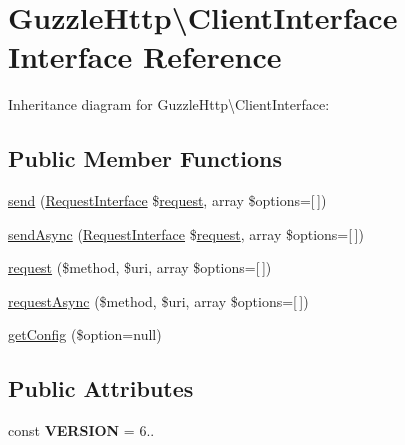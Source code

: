 \hypertarget{interfaceGuzzleHttp_1_1ClientInterface}{}\section{Guzzle\+Http\textbackslash{}Client\+Interface Interface Reference}
\label{interfaceGuzzleHttp_1_1ClientInterface}


Inheritance diagram for Guzzle\+Http\textbackslash{}Client\+Interface\+:
\subsection*{Public Member Functions}
\begin{DoxyCompactItemize}
\item 
\hyperlink{interfaceGuzzleHttp_1_1ClientInterface_a9a40e2f110ba4eb0a8a7a7a022860043}{send} (\hyperlink{interfacePsr_1_1Http_1_1Message_1_1RequestInterface}{Request\+Interface} \$\hyperlink{interfaceGuzzleHttp_1_1ClientInterface_a959a9c53eb4f138e1480e8e8b20ee71d}{request}, array \$options=\mbox{[}$\,$\mbox{]})
\item 
\hyperlink{interfaceGuzzleHttp_1_1ClientInterface_ab96c38a486e346582ab945ba74d1625a}{send\+Async} (\hyperlink{interfacePsr_1_1Http_1_1Message_1_1RequestInterface}{Request\+Interface} \$\hyperlink{interfaceGuzzleHttp_1_1ClientInterface_a959a9c53eb4f138e1480e8e8b20ee71d}{request}, array \$options=\mbox{[}$\,$\mbox{]})
\item 
\hyperlink{interfaceGuzzleHttp_1_1ClientInterface_a959a9c53eb4f138e1480e8e8b20ee71d}{request} (\$method, \$uri, array \$options=\mbox{[}$\,$\mbox{]})
\item 
\hyperlink{interfaceGuzzleHttp_1_1ClientInterface_a3c5841834717706fbb7e1da2117d7d0c}{request\+Async} (\$method, \$uri, array \$options=\mbox{[}$\,$\mbox{]})
\item 
\hyperlink{interfaceGuzzleHttp_1_1ClientInterface_a6d7e09251742f6a1227bd4abce2106e5}{get\+Config} (\$option=null)
\end{DoxyCompactItemize}
\subsection*{Public Attributes}
\begin{DoxyCompactItemize}
\item 
\mbox{\label{interfaceGuzzleHttp_1_1ClientInterface_a40c0034ad49feaeecc802d782c13fa73}} 
const {\bfseries V\+E\+R\+S\+I\+ON} = \textquotesingle{}6..\textquotesingle{}
\end{DoxyCompactItemize}


